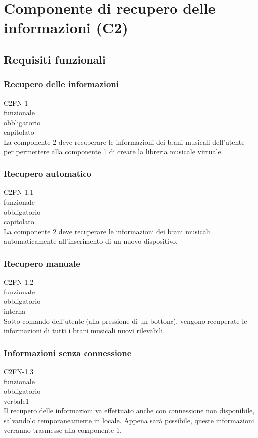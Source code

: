 
\section{Componente di recupero delle informazioni (C2)}

\subsection{Requisiti funzionali}
\subsubsection*{Recupero delle informazioni}
 C2FN-1 \\
 funzionale \\
 obbligatorio \\
 capitolato \\
La componente 2 deve recuperare le informazioni dei brani musicali dell'utente
per permettere alla componente 1 di creare la libreria musicale virtuale.

\subsubsection*{Recupero automatico}
 C2FN-1.1 \\
 funzionale \\
 obbligatorio \\
 capitolato \\
La componente 2 deve recuperare le informazioni dei brani musicali
automaticamente all'inserimento di un nuovo dispositivo.

\subsubsection*{Recupero manuale}
 C2FN-1.2 \\
 funzionale \\
 obbligatorio \\
 interna \\
Sotto comando dell'utente (alla pressione di un bottone), vengono recuperate le
informazioni di tutti i brani musicali nuovi rilevabili.

\subsubsection*{Informazioni senza connessione}
 C2FN-1.3 \\
 funzionale \\
 obbligatorio \\
 verbale1 \\
Il recupero delle informazioni va effettuato anche con connessione non
disponibile, salvandolo temporaneamente in locale. Appena sar\`a possibile, queste
informazioni verranno trasmesse alla componente 1.

